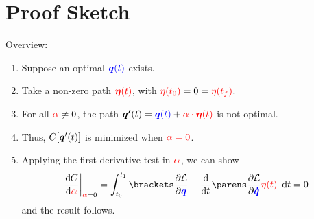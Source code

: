 \documentclass{fkpresentation}
\begin{document}
\section{Proof Sketch}
\begin{frame}{Overview:}
  \begin{enumerate}
    \item Suppose an optimal $\color{blue} \bm q(t)$ exists.
    \item Take a non-zero path $\color{red} \bm \eta(t)$, with
      ${\color{red}\eta(t_0)} = 0 = {\color{red}\eta(t_f)}$.
    \item For all ${\color{red}\alpha} \neq 0$, the path $\bm{q'}(t) =
      {\color{blue} \bm q(t)} + {\color{red} \alpha \cdot \bm{\eta}(t)}$
      is not optimal.
    \item Thus, $C[\bm q'(t)]$ is minimized when $\color{red}\alpha =
      0$.
    \item Applying the first derivative test in $\color{red} \alpha$,
      we can show
      \[
        \od{C}{{\color{red}\alpha}} \bigg\vert_{{\color{red}\alpha}=0}
        = \int_{t_0}^{t_1} \bk{\pd{\mc L}{\color{blue} \Qq} -
          \od{}{t}\pn{\pd{\mc L}{\color{blue} \bm{\dot q}}}}
        {\color{red}\eta(t)} \dd t = 0
      \]
      and the result follows.
  \end{enumerate}
\end{frame}
\end{document}
